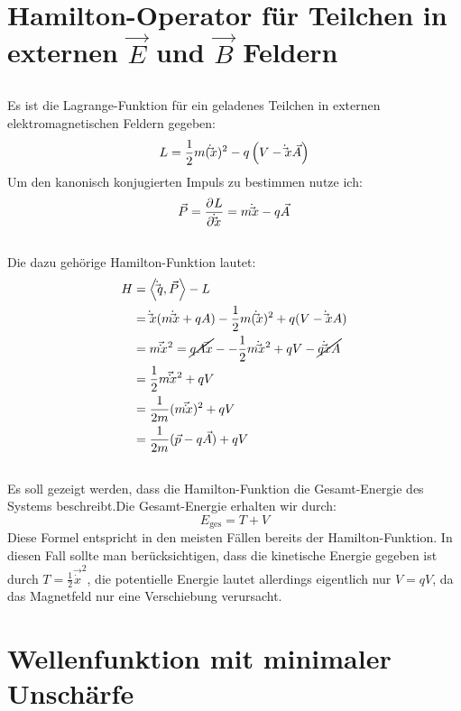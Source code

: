 \section{Hamilton-Operator für Teilchen in externen $\vec E$ und $\vec B$ Feldern}

\subsection{}
Es ist die Lagrange-Funktion für ein geladenes Teilchen in externen elektromagnetischen Feldern gegeben:
\[
    L = \frac 12 m(\dot\vec x)^2-q\del{V-\dot\vec x\vec A}
\]
Um den kanonisch konjugierten Impuls zu bestimmen nutze ich:
\[
    \vec P = \dpd{L}{\dot\vec x} = m\dot\vec x-q\vec A
\]

\subsection{}
Die dazu gehörige Hamilton-Funktion lautet:
\begin{align*}
    H &= \left\langle\dot\vec q,\vec P\right\rangle-L \\
      &= \dot\vec x(m\dot\vec x+qA) -\frac 12 m(\dot\vec x)^2+q(V-\dot\vec xA) \\
      &= m\vec\dot x^2=\cancel{qA\vec\dot x}--\frac 12m\dot\vec x^2+qV-\cancel{q\dot\vec xA} \\
      &= \frac 12 m\vec\dot x^2+qV \\
      &= \frac{1}{2m}(m\vec\dot x)^2+qV \\
      &= \frac{1}{2m}(\vec p-q\vec A)+qV
\end{align*}

\subsection{}
Es soll gezeigt werden, dass die Hamilton-Funktion die Gesamt-Energie des
Systems beschreibt.Die Gesamt-Energie erhalten wir durch:
\[
    E_\text{ges} = T+V
\]
Diese Formel entspricht in den meisten Fällen bereits der Hamilton-Funktion.
In diesen Fall sollte man berücksichtigen, dass die kinetische Energie gegeben ist durch $T= \frac 12 \vec\dot x^2$,
die potentielle Energie lautet allerdings eigentlich nur $V=qV$, da das Magnetfeld nur eine Verschiebung verursacht.

\section{Wellenfunktion mit minimaler Unschärfe}

